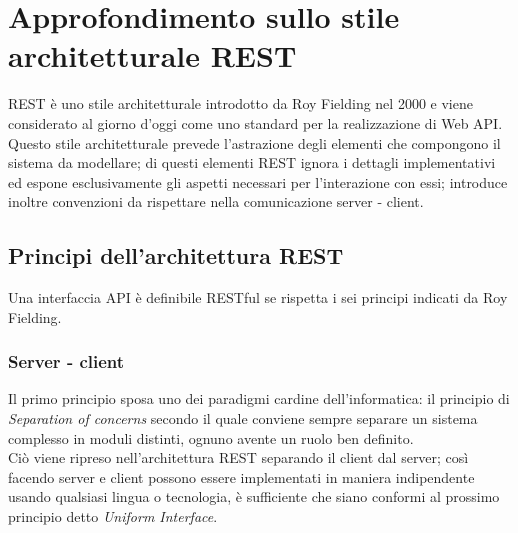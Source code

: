 \section{Approfondimento sullo stile architetturale REST}
REST è uno stile architetturale introdotto da Roy Fielding nel 2000 e viene considerato al giorno d'oggi come uno standard per la realizzazione di Web API. Questo stile architetturale prevede l'astrazione degli elementi che compongono il sistema da modellare; di questi elementi REST ignora i dettagli implementativi ed espone esclusivamente gli aspetti necessari per l'interazione con essi; introduce inoltre convenzioni da rispettare nella comunicazione server - client.
\subsection{Principi dell'architettura REST}
\label{principi-REST}
Una interfaccia API è definibile RESTful se rispetta i sei principi indicati da Roy Fielding.
\subsubsection*{Server - client}
Il primo principio sposa uno dei paradigmi cardine dell'informatica: il principio di \textit{Separation of concerns} secondo il quale conviene sempre separare un sistema complesso in moduli distinti, ognuno avente un ruolo ben definito.\\
Ciò viene ripreso nell'architettura REST separando il client dal server; così facendo server e client possono essere implementati in maniera indipendente usando qualsiasi lingua o tecnologia, è sufficiente che siano conformi al prossimo principio detto \textit{Uniform Interface}.

